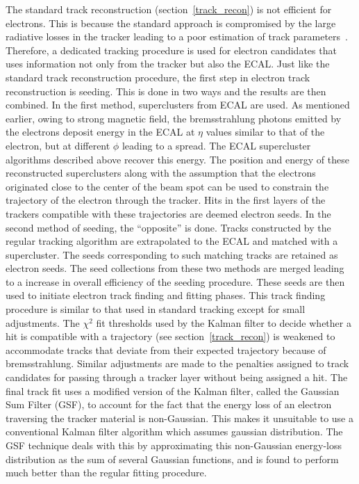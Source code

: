 The standard track reconstruction (section~\ref{track_recon}) is not efficient for electrons. This is because the standard approach is compromised by the large radiative losses in the tracker leading to a poor estimation of track parameters~\cite{track_reconstruction}. Therefore, a dedicated tracking procedure is used for electron candidates that uses information not only from the tracker but also the ECAL. Just like the standard track reconstruction procedure, the first step in electron track reconstruction is seeding. This is done in two ways and the results are then combined. In the first method, superclusters from ECAL are used. As mentioned earlier, owing to strong magnetic field, the bremsstrahlung photons emitted by the electrons deposit energy in the ECAL at $\eta$ values similar to that of the electron, but at different $\phi$ leading to a spread. The ECAL supercluster algorithms described above recover this energy. The position and  energy of these reconstructed superclusters along with the assumption that the electrons originated close to the center of the beam spot can be used to constrain the trajectory of the electron through the tracker. Hits in the first layers of the trackers compatible with these trajectories are deemed electron seeds. In the second method of seeding, the ``opposite'' is done. Tracks constructed by the regular tracking algorithm are extrapolated to the ECAL and matched with a supercluster. The seeds corresponding to such matching tracks are retained as electron seeds. The seed collections from these two methods are merged leading to a increase in overall efficiency of the seeding procedure. These seeds are then used to initiate electron track finding and fitting phases. This track finding procedure is similar to that used in standard tracking except for small adjustments. The $\chi^2$ fit thresholds used by the Kalman filter to decide whether a hit is compatible with a trajectory (see section~\ref{track_recon}) is weakened to accommodate tracks that deviate from their expected trajectory because of bremsstrahlung. Similar adjustments are made to the penalties assigned to track candidates for passing through a tracker layer without being assigned a hit. The final track fit uses a modified version of the Kalman filter, called the Gaussian Sum Filter (GSF), to account for the fact that the energy loss of an electron traversing the tracker material is non-Gaussian. This  makes it unsuitable to use a conventional Kalman filter algorithm which assumes gaussian distribution. The GSF technique deals with this by approximating this non-Gaussian energy-loss distribution as the sum of several Gaussian functions, and is found to perform much better than the regular fitting procedure.

